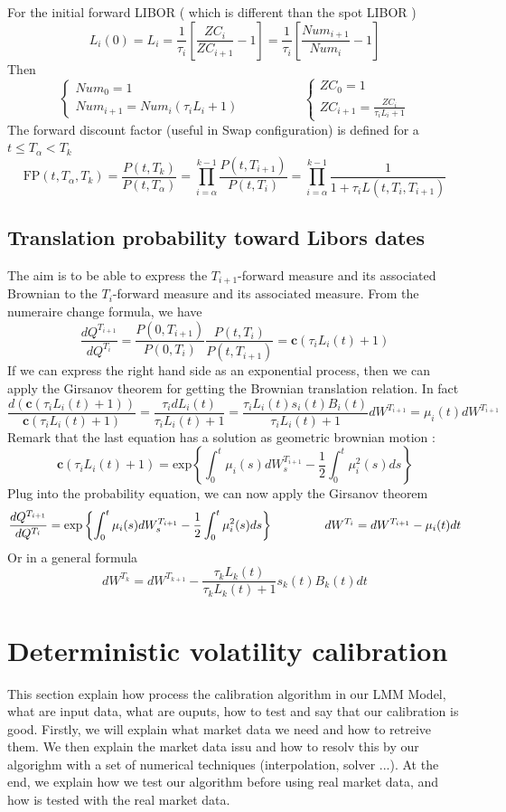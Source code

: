 \documentclass[a4paper,10pt]{article}
\newcommand{\Ti}{T_{i}}
\newcommand{\Ta}{T_{\alpha}}
\newcommand{\Tii}{T_{i+1}}
\newcommand{\Pti}{P(t,T_{i})}
\newcommand{\Ptii}{P(t,T_{i+1})}
\newcommand{\Lti}{L(t,\Ti,\Tii)}
\newcommand{\Lit}{L_{i}(t)}
\newcommand{\ZCi}{ZC_{i}}
\newcommand{\ZCii}{ZC_{i+1}}
\newcommand{\Numi}{Num_{i}}
\newcommand{\Numii}{Num_{i+1}}
\begin{document}
For the initial forward LIBOR ( which is different than the spot LIBOR )
\[
L_i(0) = L_i = \frac{1}{\tau_i} \left[ \frac{\ZCi}{\ZCii} - 1  \right] = \frac{1}{\tau_i} \left[ \frac{\Numii}{\Numi} - 1  \right]
\]
Then
\[
\left\{
\begin{array}{l}
Num_0 = 1 \\
\Numii = \Numi(\tau_i L_i +1)
\end{array}
\right.
\hspace{2cm}
\left\{
\begin{array}{l}
ZC_0 = 1 \\
\ZCii = \frac{\ZCi}{\tau_i L_i +1}
\end{array}
\right.
\]
The forward discount factor (useful in Swap configuration) is defined for a $t\leq \Ta < T_k$
\[
\text{FP}(t,\Ta,T_k)= \frac{P(t,T_k)}{P(t,\Ta)}
 = \prod^{k-1}_{i=\alpha} \frac{\Ptii}{\Pti} 
 = \prod^{k-1}_{i=\alpha} \frac{1}{1+\tau_i \Lti }
\]
\subsection{Translation probability toward Libors dates}
The aim is to be able to express the $\Tii$-forward measure and its associated Brownian to the $\Ti$-forward measure and its associated measure. From the numeraire change formula, we have
\[
\frac{dQ^{\Tii}}{dQ^{\Ti}} = \frac{P(0,\Tii)}{P(0,\Ti)}\frac{\Pti}{\Ptii} = \textbf{c} (\tau_i \Lit + 1 )
\]
If we can express the right hand side as an exponential process, then we can apply the Girsanov theorem for getting the Brownian translation relation. In fact
\[
\frac{d (\textbf{c} (\tau_i \Lit + 1 )) }{\textbf{c} (\tau_i \Lit + 1 )} 
= \frac{\tau_i d\Lit }{\tau_i \Lit +1} = \frac{\tau_i \Lit s_i(t) B_i(t) }{\tau_i \Lit +1} dW^{\Tii} = \mu_i(t)dW^{\Tii}
\]
Remark that the last equation has a solution as geometric brownian motion :
\[
\textbf{c} (\tau_i \Lit + 1 ) = \text{exp} \left\{ \int_0^t \mu_i(s)dW^{\Tii}_s - \frac{1}{2}\int_0^t \mu^2_i(s)ds \right\}
\]
Plug into the probability equation, we can now apply the Girsanov theorem
\[
\frac{dQ^{\Tii}}{dQ^{\Ti}} = \text{exp} \left\{ \int_0^t \mu_i(s)dW^{\Tii}_s - \frac{1}{2}\int_0^t \mu^2_i(s)ds \right\}
\hspace{1.5cm}
dW^{\Ti} = dW^{\Tii} - \mu_i(t)dt
\]
Or in a general formula
\[
dW^{T_{k}} = dW^{T_{k+1}} - \frac{\tau_k L_k(t)}{\tau_k L_k(t) +1}  s_k(t) B_k(t) dt
\]

\section{Deterministic volatility calibration}
This section explain how process the calibration algorithm in our LMM Model, what are input data, what are ouputs, how to test and say that our calibration is good. Firstly, we will explain what market data we need and how to retreive them. We then explain the market data issu and how to resolv this by our algorighm with a set of numerical techniques (interpolation, solver ...). At the end, we explain how we test our algorithm before using real market data, and how is tested with the real market data.   
\end{document}
